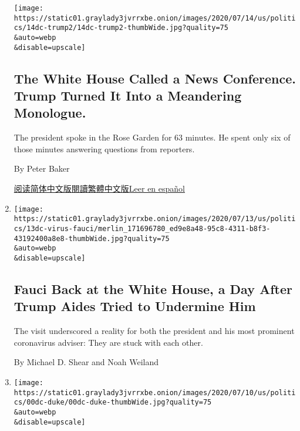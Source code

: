 \begin{enumerate}
  \texttt{[image: https://static01.graylady3jvrrxbe.onion/images/2020/07/14/us/politics/14dc-trump2/14dc-trump2-thumbWide.jpg?quality=75\\\&auto=webp\\\&disable=upscale]}

  \hypertarget{the-white-house-called-a-news-conference-trump-turned-it-into-a-meandering-monologue}{%
  \subsection{The White House Called a News Conference. Trump Turned It
  Into a Meandering
  Monologue.}\label{the-white-house-called-a-news-conference-trump-turned-it-into-a-meandering-monologue}}

  The president spoke in the Rose Garden for 63 minutes. He spent only
  six of those minutes answering questions from reporters.

  By Peter Baker

  \href{https://cn.nytimes3xbfgragh.onion/usa/20200715/trump-news-conference/}{阅读简体中文版}\href{https://cn.nytimes3xbfgragh.onion/usa/20200715/trump-news-conference/zh-hant/}{閱讀繁體中文版}\href{https://www.nytimes3xbfgragh.onion/es/2020/07/15/espanol/estados-unidos/trump-conferencia-prensa.html}{Leer
  en español}
\item
  \href{/2020/07/13/us/politics/fauci-trump-coronavirus.html}{}

  \texttt{[image: https://static01.graylady3jvrrxbe.onion/images/2020/07/13/us/politics/13dc-virus-fauci/merlin\_171696780\_ed9e8a48-95c8-4311-b8f3-43192400a8e8-thumbWide.jpg?quality=75\\\&auto=webp\\\&disable=upscale]}

  \hypertarget{fauci-back-at-the-white-house-a-day-after-trump-aides-tried-to-undermine-him}{%
  \subsection{Fauci Back at the White House, a Day After Trump Aides
  Tried to Undermine
  Him}\label{fauci-back-at-the-white-house-a-day-after-trump-aides-tried-to-undermine-him}}

  The visit underscored a reality for both the president and his most
  prominent coronavirus adviser: They are stuck with each other.

  By Michael D. Shear and Noah Weiland
\item
  \href{/2020/07/10/us/politics/elaine-duke-homeland-security-trump.html}{}

  \texttt{[image: https://static01.graylady3jvrrxbe.onion/images/2020/07/10/us/politics/00dc-duke/00dc-duke-thumbWide.jpg?quality=75\\\&auto=webp\\\&disable=upscale]}


\end{enumerate}
